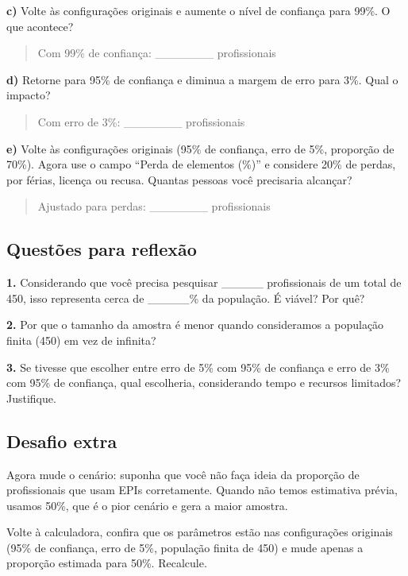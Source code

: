 \documentclass[
]{book}
\begin{document}
\textbf{c)} Volte às configurações originais e aumente o nível de confiança para 99\%. O que acontece?

\begin{quote}
Com 99\% de confiança: \_\_\_\_\_\_\_ profissionais
\end{quote}

\textbf{d)} Retorne para 95\% de confiança e diminua a margem de erro para 3\%. Qual o impacto?

\begin{quote}
Com erro de 3\%: \_\_\_\_\_\_\_ profissionais
\end{quote}

\textbf{e)} Volte às configurações originais (95\% de confiança, erro de 5\%, proporção de 70\%). Agora use o campo ``Perda de elementos (\%)'' e considere 20\% de perdas, por férias, licença ou recusa. Quantas pessoas você precisaria alcançar?

\begin{quote}
Ajustado para perdas: \_\_\_\_\_\_\_ profissionais
\end{quote}

\subsection{Questões para reflexão}\label{questuxf5es-para-reflexuxe3o}

\textbf{1.} Considerando que você precisa pesquisar \_\_\_\_\_ profissionais de um total de 450, isso representa cerca de \_\_\_\_\_\% da população. É viável? Por quê?

\textbf{2.} Por que o tamanho da amostra é menor quando consideramos a população finita (450) em vez de infinita?

\textbf{3.} Se tivesse que escolher entre erro de 5\% com 95\% de confiança e erro de 3\% com 95\% de confiança, qual escolheria, considerando tempo e recursos limitados? Justifique.

\subsection{Desafio extra}\label{desafio-extra}

Agora mude o cenário: suponha que você não faça ideia da proporção de profissionais que usam EPIs corretamente. Quando não temos estimativa prévia, usamos 50\%, que é o pior cenário e gera a maior amostra.

Volte à calculadora, confira que os parâmetros estão nas configurações originais (95\% de confiança, erro de 5\%, população finita de 450) e mude apenas a proporção estimada para 50\%. Recalcule.
\end{document}
